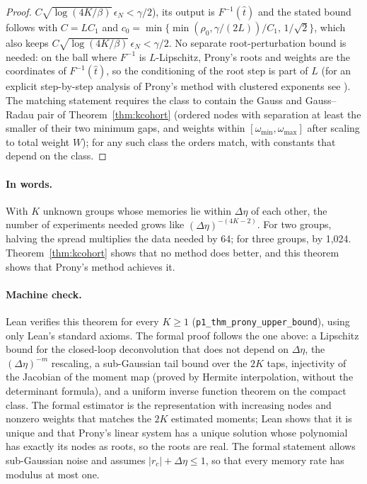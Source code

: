 \documentclass[12pt]{article}
\theoremstyle{definition}
\theoremstyle{remark}
\begin{document}
\begin{proof}
$C\sqrt{\log(4K/\beta)}\,\epsilon_N<\gamma/2$), its output is $F^{-1}(\hat t)$ and the stated bound follows with $C=LC_1$ and $c_0=\min\{\min(\rho_0,\gamma/(2L))/C_1,\,1/\sqrt2\}$, which also keeps $C\sqrt{\log(4K/\beta)}\,\epsilon_N<\gamma/2$. No separate root-perturbation bound is needed: on the ball where $F^{-1}$ is $L$-Lipschitz, Prony's roots and weights are the coordinates of $F^{-1}(\hat t)$, so the conditioning of the root step is part of $L$ (for an explicit step-by-step analysis of Prony's method with clustered exponents see \citealp{katz2023}). The matching statement requires the class to contain the Gauss and Gauss--Radau pair of Theorem~\ref{thm:kcohort} (ordered nodes with separation at least the smaller of their two minimum gaps, and weights within $[\omega_{\min},\omega_{\max}]$ after scaling to total weight $W$); for any such class the orders match, with constants that depend on the class.
\end{proof}

\paragraph{In words.} With $K$ unknown groups whose memories lie within $\Delta\eta$ of each other, the number of experiments needed grows like $(\Delta\eta)^{-(4K-2)}$. For two groups, halving the spread multiplies the data needed by 64; for three groups, by 1{,}024. Theorem~\ref{thm:kcohort} shows that no method does better, and this theorem shows that Prony's method achieves it.

\paragraph{Machine check.} Lean verifies this theorem for every $K\ge1$ (\texttt{p1\_thm\_prony\_upper\_bound}), using only Lean's standard axioms. The formal proof follows the one above: a Lipschitz bound for the closed-loop deconvolution that does not depend on $\Delta\eta$, the $(\Delta\eta)^{-m}$ rescaling, a sub-Gaussian tail bound over the $2K$ taps, injectivity of the Jacobian of the moment map (proved by Hermite interpolation, without the determinant formula), and a uniform inverse function theorem on the compact class. The formal estimator is the representation with increasing nodes and nonzero weights that matches the $2K$ estimated moments; Lean shows that it is unique and that Prony's linear system has a unique solution whose polynomial has exactly its nodes as roots, so the roots are real. The formal statement allows sub-Gaussian noise and assumes $|r_c|+\Delta\eta\le1$, so that every memory rate has modulus at most one.
\end{document}

